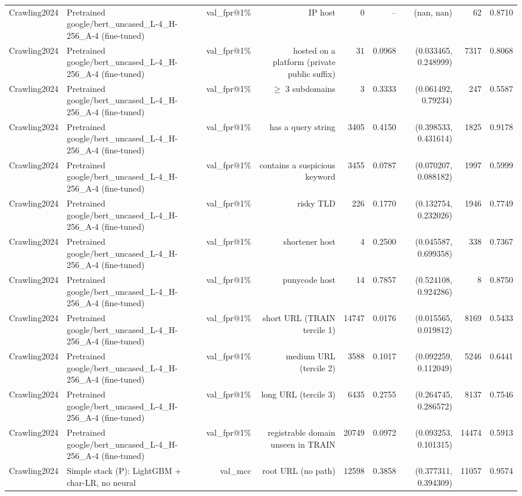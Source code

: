 \begin{table}[t]
\begin{tabular}{llrrrrrrr}
Crawling2024 & Pretrained google/bert\_uncased\_L-4\_H-256\_A-4 (fine-tuned) & val\_fpr@1\% & IP host & 0 & -- & (nan, nan) & 62 & 0.8710 \\
Crawling2024 & Pretrained google/bert\_uncased\_L-4\_H-256\_A-4 (fine-tuned) & val\_fpr@1\% & hosted on a platform (private public suffix) & 31 & 0.0968 & (0.033465, 0.248999) & 7317 & 0.8068 \\
Crawling2024 & Pretrained google/bert\_uncased\_L-4\_H-256\_A-4 (fine-tuned) & val\_fpr@1\% & $\geq$ 3 subdomains & 3 & 0.3333 & (0.061492, 0.79234) & 247 & 0.5587 \\
Crawling2024 & Pretrained google/bert\_uncased\_L-4\_H-256\_A-4 (fine-tuned) & val\_fpr@1\% & has a query string & 3405 & 0.4150 & (0.398533, 0.431614) & 1825 & 0.9178 \\
Crawling2024 & Pretrained google/bert\_uncased\_L-4\_H-256\_A-4 (fine-tuned) & val\_fpr@1\% & contains a suspicious keyword & 3455 & 0.0787 & (0.070207, 0.088182) & 1997 & 0.5999 \\
Crawling2024 & Pretrained google/bert\_uncased\_L-4\_H-256\_A-4 (fine-tuned) & val\_fpr@1\% & risky TLD & 226 & 0.1770 & (0.132754, 0.232026) & 1946 & 0.7749 \\
Crawling2024 & Pretrained google/bert\_uncased\_L-4\_H-256\_A-4 (fine-tuned) & val\_fpr@1\% & shortener host & 4 & 0.2500 & (0.045587, 0.699358) & 338 & 0.7367 \\
Crawling2024 & Pretrained google/bert\_uncased\_L-4\_H-256\_A-4 (fine-tuned) & val\_fpr@1\% & punycode host & 14 & 0.7857 & (0.524108, 0.924286) & 8 & 0.8750 \\
Crawling2024 & Pretrained google/bert\_uncased\_L-4\_H-256\_A-4 (fine-tuned) & val\_fpr@1\% & short URL (TRAIN tercile 1) & 14747 & 0.0176 & (0.015565, 0.019812) & 8169 & 0.5433 \\
Crawling2024 & Pretrained google/bert\_uncased\_L-4\_H-256\_A-4 (fine-tuned) & val\_fpr@1\% & medium URL (tercile 2) & 3588 & 0.1017 & (0.092259, 0.112049) & 5246 & 0.6441 \\
Crawling2024 & Pretrained google/bert\_uncased\_L-4\_H-256\_A-4 (fine-tuned) & val\_fpr@1\% & long URL (tercile 3) & 6435 & 0.2755 & (0.264745, 0.286572) & 8137 & 0.7546 \\
Crawling2024 & Pretrained google/bert\_uncased\_L-4\_H-256\_A-4 (fine-tuned) & val\_fpr@1\% & registrable domain unseen in TRAIN & 20749 & 0.0972 & (0.093253, 0.101315) & 14474 & 0.5913 \\
Crawling2024 & Simple stack (P): LightGBM + char-LR, no neural & val\_mcc & root URL (no path) & 12598 & 0.3858 & (0.377311, 0.394309) & 11057 & 0.9574 \\

\end{tabular}
\end{table}
